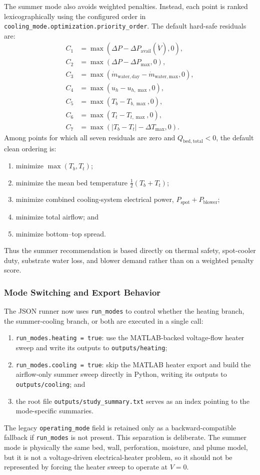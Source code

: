 \documentclass{article}
\begin{document}
The summer mode also avoids weighted penalties. Instead, each point is
ranked lexicographically using the configured order in
\texttt{cooling\_mode.optimization.priority\_order}. The default hard-safe
residuals are:
\begin{align}
C_1 &= \max(\Delta P - \Delta P_{\mathrm{avail}}(\dot V),0), \\
C_2 &= \max(\Delta P - \Delta P_{\max},0), \\
C_3 &= \max(\dot m_{\mathrm{water,day}} - \dot m_{\mathrm{water,max}},0), \\
C_4 &= \max(u_h - u_{h,\max},0), \\
C_5 &= \max(T_b - T_{b,\max},0), \\
C_6 &= \max(T_t - T_{t,\max},0), \\
C_7 &= \max(|T_b-T_t| - \Delta T_{\max},0).
\end{align}
Among points for which all seven residuals are zero and
$Q_{\mathrm{bed,total}}<0$, the default clean ordering is:
\begin{enumerate}
\item minimize $\max(T_b,T_t)$;
\item minimize the mean bed temperature $\tfrac{1}{2}(T_b+T_t)$;
\item minimize combined cooling-system electrical power,
      $P_{\mathrm{spot}} + P_{\mathrm{blower}}$;
\item minimize total airflow; and
\item minimize bottom--top spread.
\end{enumerate}
Thus the summer recommendation is based directly on thermal safety,
spot-cooler duty, substrate water loss, and blower demand rather than on a
weighted penalty score.

\subsubsection{Mode Switching and Export Behavior}

The JSON runner now uses \texttt{run\_modes} to control whether the heating
branch, the summer-cooling branch, or both are executed in a single call:
\begin{enumerate}
\item \texttt{run\_modes.heating = true}: use the MATLAB-backed
      voltage-flow heater sweep and write its outputs to
      \texttt{outputs/heating};
\item \texttt{run\_modes.cooling = true}: skip the MATLAB heater export and
      build the airflow-only summer sweep directly in Python, writing its
      outputs to \texttt{outputs/cooling}; and
\item the root file \texttt{outputs/study\_summary.txt} serves as an index
      pointing to the mode-specific summaries.
\end{enumerate}
The legacy \texttt{operating\_mode} field is retained only as a
backward-compatible fallback if \texttt{run\_modes} is not present.
This separation is deliberate. The summer mode is physically the same bed,
wall, perforation, moisture, and plume model, but it is not a voltage-driven
electrical-heater problem, so it should not be represented by forcing the
heater sweep to operate at $V=0$.
\end{document}

